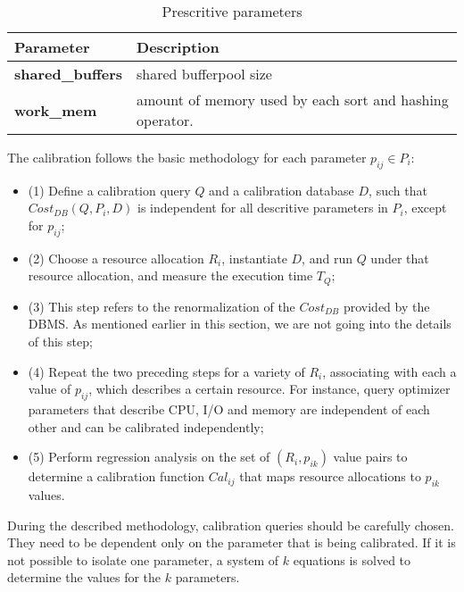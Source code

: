 \begin{table}[ht]
    \centering
    \begin{tabular}{ | l | p{5cm} |}
    \hline
      Parameter & Description  \\ \hline
    \textbf{shared\_buffers} & shared bufferpool size \\ \hline
    \textbf{work\_mem} & amount of memory used by each sort and hashing operator. \\
    \hline
    \end{tabular}
    \caption{Prescritive parameters}
    \label{table:prescritive}
\end{table}

The calibration follows the basic methodology for each parameter $p_{ij} \in P_{i}$:

\begin{itemize}
 \item (1) Define a calibration query $Q$ and a calibration database $D$, such that $Cost_{DB}(Q,P_{i},D)$ is independent for all descritive parameters in $P_{i}$, except for $p_{ij}$; \\
  \item (2) Choose a resource allocation $R_{i}$, instantiate $D$, and run $Q$ under that resource allocation, and measure the execution time $T_{Q}$; \\
  \item (3) This step refers to the renormalization of the $Cost_{DB}$ provided by the DBMS. As mentioned earlier in this section, we are not going into the details of this step; \\
  \item (4) Repeat the two preceding steps for a variety of $R_{i}$, associating with each  a value of $p_{ij}$, which describes a certain resource. For instance, query optimizer parameters that describe CPU, I/O and memory are independent of each other and can be calibrated independently; \\
  \item (5) Perform regression analysis on the set of $(R_{i},p_{ik})$ value pairs to determine a calibration function $Cal_{ij}$ that maps resource allocations to $p_{ik}$ values. \\
\end{itemize}

During the described methodology, calibration queries should be carefully chosen. They need to be dependent only on the parameter that is being calibrated. If it is not possible to isolate one parameter, a system of $k$ equations is solved to determine the values for the $k$ parameters.

